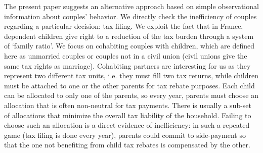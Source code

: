 The present paper suggests an alternative approach based on simple observational information about couples’ behavior. We directly check the inefficiency of couples regarding a particular decision: tax filing. We exploit the fact that in France, dependent children give right to a reduction of the tax burden through a system of `family ratio’. We focus on cohabiting couples with children, which are defined here as unmarried couples or couples not in a civil union (civil unions give the same tax rights as marriage). Cohabiting partners are interesting for us as they represent two different tax units, i.e. they must fill two tax returns, while children must be attached to one or the other parents for tax rebate purposes. Each child can be allocated to only one of the parents, so every year, parents must choose an allocation that is often non-neutral for tax payments. There is usually a sub-set of allocations that minimize the overall tax liability of the household. Failing to choose such an allocation is a direct evidence of inefficiency: in such a repeated game (tax filing is done every year), parents could commit to side-payment so that the one not benefiting from child tax rebates is compensated by the other.  

